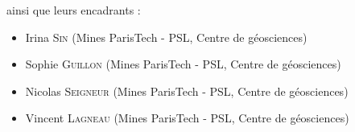 \documentclass{article}
\begin{document}
ainsi que leurs encadrants :
\begin{itemize}
    \item Irina \textsc{Sin} (Mines ParisTech - PSL, Centre de géosciences) 
    \item Sophie \textsc{Guillon} (Mines ParisTech - PSL, Centre de géosciences) 
    \item Nicolas \textsc{Seigneur} (Mines ParisTech - PSL, Centre de géosciences) 
    \item Vincent \textsc{Lagneau} (Mines ParisTech - PSL, Centre de géosciences) 
\end{itemize}

\end{document}
